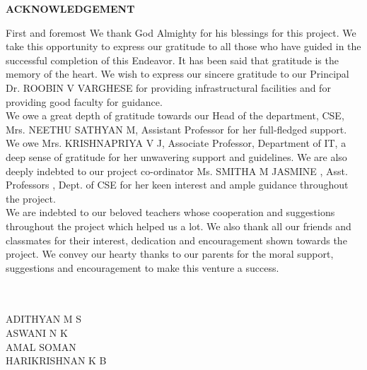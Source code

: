 	\begin{center}
		\textbf{\LARGE{ACKNOWLEDGEMENT}}\\[0.5cm]
	\end{center}
	First and foremost We thank God Almighty for his blessings for this project. We take this opportunity to express our gratitude to all those who have guided in the successful completion of this Endeavor. It has been said that gratitude is the memory of the heart. We wish to express our sincere gratitude to our Principal Dr. ROOBIN V VARGHESE for providing infrastructural facilities and for providing good faculty for guidance.\\
	
We owe a great depth of gratitude towards our Head of the department, CSE, Mrs. NEETHU SATHYAN M,  Assistant Professor for her full-fledged support. We owe Mrs. KRISHNAPRIYA V J, Associate Professor, Department of  IT, a deep sense of gratitude for her unwavering support and guidelines. We are also deeply indebted to our project co-ordinator Ms. SMITHA M JASMINE , Asst. Professors , Dept. of CSE for her keen interest and ample guidance throughout the project.  \\

	We are indebted to our beloved teachers whose cooperation and suggestions throughout the project which helped us a lot. We also thank all our friends and classmates for their interest, dedication and encouragement shown towards the project. We convey our hearty thanks to our parents for the moral support,  suggestions and encouragement to make this venture a success.\textbf{\\}\textbf{\\}\textbf{\\}
	\begin{FlushLeft}
	\hspace{9.5cm}
ADITHYAN M S\\\vspace{0.1cm}
\hspace{9.5cm}
ASWANI N K\\\vspace{0.1cm}
\hspace{9.5cm}
AMAL SOMAN \\ \vspace{0.1cm}
\hspace{9.5cm}
HARIKRISHNAN K B\\
	\end{FlushLeft}

	
	

